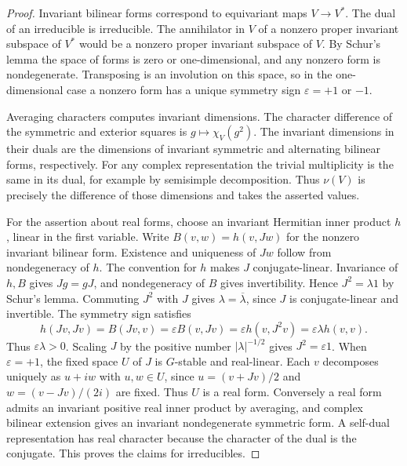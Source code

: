 \documentclass[11pt,oneside,openany]{book}
\theoremstyle{definition}
\theoremstyle{remark}
\begin{document}
\begin{proof}
Invariant bilinear forms correspond to equivariant maps \(V\to V^*\).
The dual of an irreducible is irreducible. The annihilator in \(V\)
of a nonzero proper invariant subspace of \(V^*\) would be a
nonzero proper invariant subspace of \(V\). By Schur's lemma the
space of forms is zero or one-dimensional, and any nonzero form
is nondegenerate. Transposing is an involution on this space, so
in the one-dimensional case a nonzero form has a unique symmetry
sign \(\varepsilon=+1\) or \(-1\).

Averaging characters computes invariant dimensions. The character
difference of the symmetric and exterior squares is
\(g\mapsto\chi_V(g^2)\). The invariant dimensions in their duals are
the dimensions of invariant symmetric and alternating bilinear
forms, respectively. For any complex representation the trivial
multiplicity is the same in its dual, for example by semisimple
decomposition. Thus \(\nu(V)\) is precisely the difference of
those dimensions and takes the asserted values.

For the assertion about real forms, choose an invariant Hermitian
inner product \(h\), linear in the first variable. Write
\(B(v,w)=h(v,Jw)\) for the nonzero invariant bilinear form.
Existence and uniqueness of \(Jw\) follow from nondegeneracy of
\(h\). The convention for \(h\) makes \(J\) conjugate-linear.
Invariance of \(h,B\) gives \(Jg=gJ\), and nondegeneracy of \(B\)
gives invertibility. Hence \(J^2=\lambda 1\) by Schur's lemma.
Commuting \(J^2\) with \(J\) gives
\(\lambda=\overline\lambda\), since \(J\) is conjugate-linear and
invertible. The symmetry sign satisfies
\[
 h(Jv,Jv)=B(Jv,v)=\varepsilon B(v,Jv)
   =\varepsilon h(v,J^2v)=\varepsilon\lambda h(v,v).
\]
Thus \(\varepsilon\lambda>0\). Scaling \(J\) by the positive
number \(|\lambda|^{-1/2}\) gives \(J^2=\varepsilon 1\).
When \(\varepsilon=+1\), the fixed space \(U\) of \(J\) is
\(G\)-stable and real-linear. Each \(v\) decomposes uniquely as
\(u+iw\) with \(u,w\in U\), since
\(u=(v+Jv)/2\) and \(w=(v-Jv)/(2i)\) are fixed. Thus \(U\) is a
real form. Conversely a real form admits an invariant positive
real inner product by averaging, and complex bilinear extension
gives an invariant nondegenerate symmetric form. A self-dual
representation has real character because the character of
the dual is the conjugate. This proves the claims for irreducibles.


\end{proof}
\end{document}
